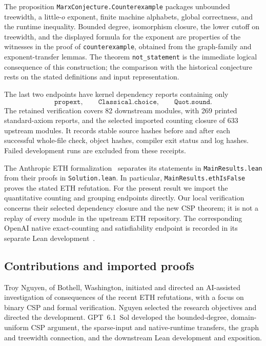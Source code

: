 \documentclass[11pt,reqno]{amsart}
\numberwithin{equation}{section}
\theoremstyle{definition}
\theoremstyle{remark}
\begin{document}
The proposition \texttt{MarxConjecture.Counterexample} packages unbounded treewidth, a little-$o$ exponent, finite machine alphabets, global correctness, and the runtime inequality. Bounded degree, isomorphism closure, the lower cutoff on treewidth, and the displayed formula for the exponent are properties of the witnesses in the proof of \texttt{counterexample}, obtained from the graph-family and exponent-transfer lemmas. The theorem \texttt{not\_statement} is the immediate logical consequence of this construction; the comparison with the historical conjecture rests on the stated definitions and input representation.

The last two endpoints have kernel dependency reports containing only
\[
 \texttt{propext},\qquad
 \texttt{Classical.choice},\qquad
 \texttt{Quot.sound}.
\]
The retained verification covers 82 downstream modules, with 269 printed standard-axiom reports, and the selected imported counting closure of 633 upstream modules. It records stable source hashes before and after each successful whole-file check, object hashes, compiler exit status and log hashes. Failed development runs are excluded from these receipts.

The Anthropic ETH formalization~\cite{AnthropicLean} separates its statements in \texttt{MainResults.lean} from their proofs in \texttt{Solution.lean}. In particular, \texttt{MainResults.ethIsFalse} proves the stated ETH refutation. For the present result we import the quantitative counting and grouping endpoints directly. Our local verification concerns their selected dependency closure and the new CSP theorem; it is not a replay of every module in the upstream ETH repository. The corresponding OpenAI native exact-counting and satisfiability endpoint is recorded in its separate Lean development~\cite{OpenAILean}.

\subsection{Contributions and imported proofs}\label{sec:provenance}

Troy Nguyen, of Bothell, Washington, initiated and directed an AI-assisted investigation of consequences of the recent ETH refutations, with a focus on binary CSP and formal verification. Nguyen selected the research objectives and directed the development. GPT~6.1~Sol developed the bounded-degree, domain-uniform CSP argument, the sparse-input and native-runtime transfers, the graph and treewidth connection, and the downstream Lean development and exposition.
\end{document}

